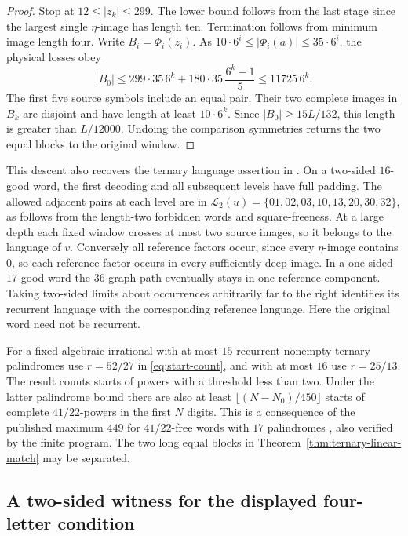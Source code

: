 \begin{proof}
Stop at \(12\le|z_k|\le299\). The lower bound follows from the last stage since the largest single \(\eta\)-image has length ten. Termination follows from minimum image length four. Write \(B_i=\Phi_i(z_i)\). As \(10\cdot6^i\le|\Phi_i(a)|\le35\cdot6^i\), the physical losses obey
\[
 |B_0|\le 299\cdot35\,6^k+180\cdot35\,\frac{6^k-1}{5}
 \le11725\,6^k .
\]
The first five source symbols include an equal pair. Their two complete images in \(B_k\) are disjoint and have length at least \(10\cdot6^k\). Since \(|B_0|\ge15L/132\), this length is greater than \(L/12000\). Undoing the comparison symmetries returns the two equal blocks to the original window.
\end{proof}

This descent also recovers the ternary language assertion in \cite[Theorem~8(b),(c)]{DMO}. On a two-sided \(16\)-good word, the first decoding and all subsequent levels have full padding. The allowed adjacent pairs at each level are in \(\mathcal L_2(u)=\{01,02,03,10,13,20,30,32\}\), as follows from the length-two forbidden words and square-freeness. At a large depth each fixed window crosses at most two source images, so it belongs to the language of \(v\). Conversely all reference factors occur, since every \(\eta\)-image contains \(0\), so each reference factor occurs in every sufficiently deep image. In a one-sided \(17\)-good word the \(36\)-graph path eventually stays in one reference component. Taking two-sided limits about occurrences arbitrarily far to the right identifies its recurrent language with the corresponding reference language. Here the original word need not be recurrent.

For a fixed algebraic irrational with at most \(15\) recurrent nonempty ternary palindromes use \(r=52/27\) in \eqref{eq:start-count}, and with at most \(16\) use \(r=25/13\). The result counts starts of powers with a threshold less than two. Under the latter palindrome bound there are also at least \(\lfloor(N-N_0)/450\rfloor\) starts of complete \(41/22\)-powers in the first \(N\) digits. This is a consequence of the published maximum \(449\) for \(41/22\)-free words with \(17\) palindromes \cite[Theorem~1(d)]{DMO}, also verified by the finite program. The two long equal blocks in Theorem~\ref{thm:ternary-linear-match} may be separated.

\subsection{A two-sided witness for the displayed four-letter condition}

